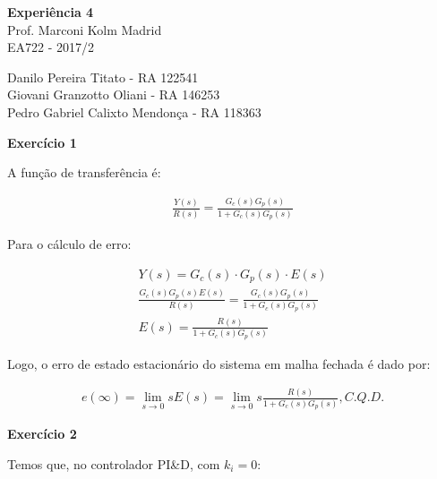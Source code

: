 \documentclass[a4paper,11pt]{article}
\begin{document}
	

\begin{center}
\textbf{Experiência 4} \\
\hspace{5pt}
Prof. Marconi Kolm Madrid \\
EA722 - 2017/2
\end{center}

\begin{center}
Danilo Pereira Titato - RA 122541 \\
Giovani Granzotto Oliani - RA 146253 \\
Pedro Gabriel Calixto Mendonça - RA 118363 \\
\end{center}

\textbf{Exercício 1}

A função de transferência é:

\begin{gather*}
    \frac{Y\left(s\right)}{R\left(s\right)} =
        \frac{G_c\left(s\right) G_p\left(s\right)}
        {1 + G_c\left(s\right) G_p\left(s\right)}
\end{gather*}

Para o cálculo de erro:

\begin{gather*}
    Y\left(s\right) = G_c\left(s\right) \cdot G_p\left(s\right) \cdot
        E\left(s\right) \\
    \frac{G_c\left(s\right) G_p\left(s\right) E\left(s\right)}{R\left(s\right)}
        = \frac{G_c\left(s\right) G_p\left(s\right)}
        {1 + G_c\left(s\right) G_p\left(s\right)} \\
    E\left(s\right) = \frac{R\left(s\right)}
        {1 + G_c\left(s\right) G_p\left(s\right)}
\end{gather*}

Logo, o erro de estado estacionário do sistema em malha fechada é dado por:

\begin{gather*}
    e\left(\infty\right) = \lim_{s \to 0} s E\left(s\right) =
        \lim_{s \to 0} s \frac{R\left(s\right)}
        {1 + G_c\left(s\right) G_p\left(s\right)}, C.Q.D.
\end{gather*}

\textbf{Exercício 2}

Temos que, no controlador PI\&D, com $k_i = 0$:
\end{document}
